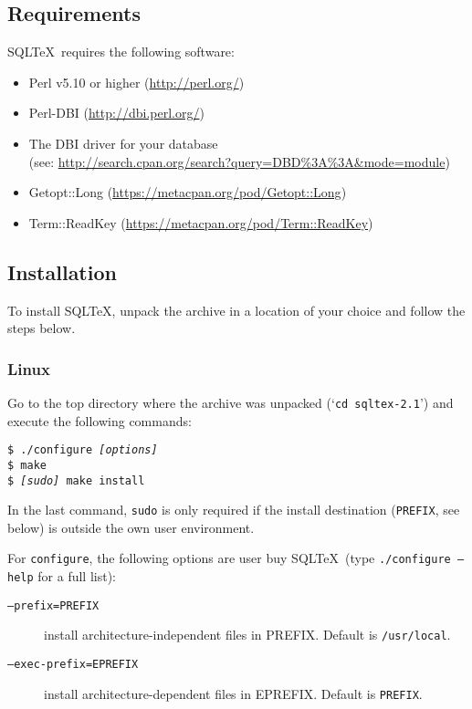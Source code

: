 \documentclass{article}
\newcommand{\vs}{\vspace{3mm}}
\begin{document}
\subsection{Requirements}

SQL\TeX\ requires the following software:

\begin{itemize}
\item Perl v5.10 or higher (\url{http://perl.org/})
\item Perl-DBI      (\url{http://dbi.perl.org/})
\item The DBI driver for your database\\(see: \url{http://search.cpan.org/search?query=DBD\%3A\%3A\&mode=module})
\item Getopt::Long   (\url{https://metacpan.org/pod/Getopt::Long})
\item Term::ReadKey (\url{https://metacpan.org/pod/Term::ReadKey})
\end{itemize}

\subsection{Installation}

To install SQL\TeX, unpack the archive in a location of your choice and follow the steps below.

\subsubsection{Linux}

Go to the top directory where the archive was unpacked (`\texttt{cd sqltex-2.1}') and execute the following commands:

\vs

\noindent\texttt{\$ ./configure \textit{[options]}\\
\$ make \\
\$ \textit{[sudo] }make install}

\vs

In the last command, \texttt{sudo} is only required if the install destination (\texttt{PREFIX}, see below) is outside the own user environment.

\vs

For \texttt{configure}, the following options are user buy SQL\TeX\ (type \texttt{./configure --help} for a full list):

\begin{description}
\item[\texttt{--prefix=PREFIX}]         install architecture-independent files in PREFIX. Default is \texttt{/usr/local}.
\item[\texttt{--exec-prefix=EPREFIX}]   install architecture-dependent files in EPREFIX. Default is \texttt{PREFIX}.
\end{description}
\end{document}
